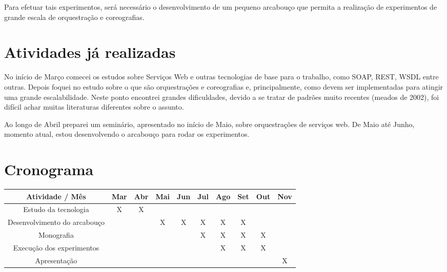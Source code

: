 \documentclass[11pt,a4paper]{article}
\begin{document}
Para efetuar tais experimentos, será necessário o desenvolvimento de um pequeno arcabouço que permita a realização de experimentos de grande escala de orquestração e coreografias.

\section{Atividades já realizadas}
No início de Março comecei os estudos sobre Serviços Web e outras tecnologias de base para o trabalho, como SOAP, REST, WSDL entre outras. Depois foquei no estudo sobre o que são orquestrações e coreografias e, principalmente, como devem ser implementadas para atingir uma grande escalabilidade. Neste ponto encontrei grandes dificuldades, devido a se tratar de padrões muito recentes (meados de 2002), foi difícil achar muitas literaturas diferentes sobre o assunto.

Ao longo de Abril preparei um seminário, apresentado no início de Maio, sobre orquestrações de serviços web. De Maio até Junho, momento atual, estou desenvolvendo o arcabouço para rodar os experimentos.


\section{Cronograma}

\begin{table}[h]
  \begin{center}
    \begin{tabular}[h]{ | c || @{}c@{} | @{}c@{} | @{}c@{} | @{}c@{} | @{}c@{} | @{}c@{} | @{}c@{} | @{}c@{} | @{}c@{} |}
      \hline
      \textbf{Atividade / Mês}              & \textbf{Mar} & \textbf{Abr} & \textbf{Mai} & \textbf{Jun} & \textbf{Jul} & \textbf{Ago} & \textbf{Set} & \textbf{Out} & \textbf{Nov} \\
      \hline
      \hline
      Estudo da tecnologia         &  X  &  X  &     &     &     &     &     &     &     \\
      \hline
      Desenvolvimento do arcabouço &     &     &  X  &  X  &  X  &  X  &  X  &     &     \\
      \hline
      Monografia                   &     &     &     &     &  X  &  X  &  X  &  X  &     \\
      \hline
      Execução dos experimentos    &     &     &     &     &     &  X  &  X  &  X  &     \\
      \hline
      Apresentação                 &     &     &     &     &     &     &     &     &  X  \\
      \hline
    \end{tabular}
  \end{center}
\end{table}
\end{document}
